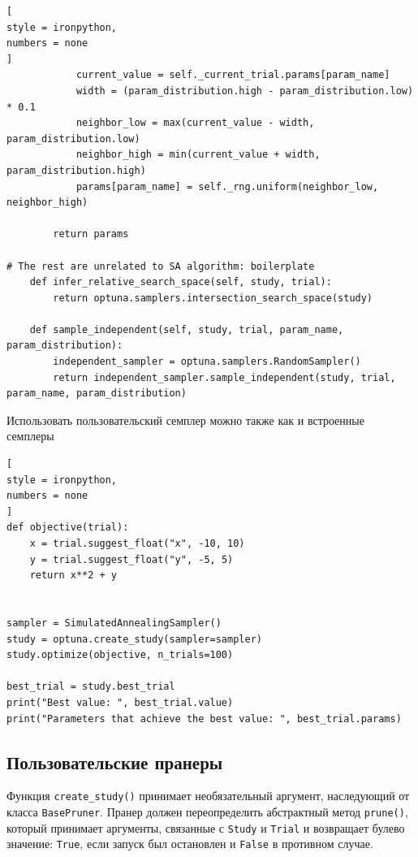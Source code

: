 \documentclass[%
	11pt,
	a4paper,
	utf8,
		]{article}
\begin{document}
\begin{lstlisting}[
style = ironpython,
numbers = none
]
			current_value = self._current_trial.params[param_name]
			width = (param_distribution.high - param_distribution.low) * 0.1
			neighbor_low = max(current_value - width, param_distribution.low)
			neighbor_high = min(current_value + width, param_distribution.high)
			params[param_name] = self._rng.uniform(neighbor_low, neighbor_high)

		return params

# The rest are unrelated to SA algorithm: boilerplate
	def infer_relative_search_space(self, study, trial):
		return optuna.samplers.intersection_search_space(study)

	def sample_independent(self, study, trial, param_name, param_distribution):
		independent_sampler = optuna.samplers.RandomSampler()
		return independent_sampler.sample_independent(study, trial, param_name, param_distribution)
\end{lstlisting}

Использовать пользовательский семплер можно также как и встроенные семплеры
\begin{lstlisting}[
style = ironpython,
numbers = none
]
def objective(trial):
	x = trial.suggest_float("x", -10, 10)
	y = trial.suggest_float("y", -5, 5)
	return x**2 + y


sampler = SimulatedAnnealingSampler()
study = optuna.create_study(sampler=sampler)
study.optimize(objective, n_trials=100)

best_trial = study.best_trial
print("Best value: ", best_trial.value)
print("Parameters that achieve the best value: ", best_trial.params)
\end{lstlisting}

\subsection{Пользовательские пранеры}

Функция \verb|create_study()| принимает необязательный аргумент, наследующий от класса \verb|BasePruner|. Пранер должен переопределить абстрактный метод \verb|prune()|, который принимает аргументы, связанные с \verb|Study| и \verb|Trial| и возвращает булево значение: \verb|True|, если запуск был остановлен и \verb|False| в противном случае.
\end{document}
